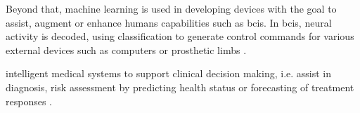 Beyond that, machine learning is used in developing devices with the goal to assist, augment or enhance humans capabilities such as \glspl{bci}. In \glspl{bci}, neural activity is decoded, using classification to generate control commands for various external devices such as computers or prosthetic limbs \cite{Saha2021, Anumanchipalli2019}.







intelligent medical systems to support clinical decision making, i.e. assist in diagnosis, risk assessment by predicting health status or forecasting of treatment responses \cite{Woo2017}.





















